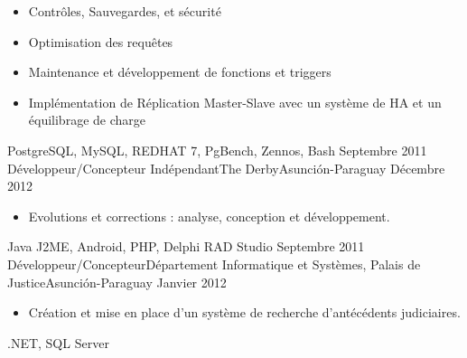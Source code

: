\begin{experiences}
{\begin{itemize}
                        \item Contrôles, Sauvegardes, et sécurité
                        \item Optimisation des requêtes
                        \item Maintenance et développement de fonctions et triggers
                        \item Implémentation de Réplication Master-Slave avec un système de HA et un équilibrage de charge
                      \end{itemize}
				}
                {PostgreSQL, MySQL, REDHAT 7, PgBench, Zennos, Bash}
  \emptySeparator
  \experience
    {Septembre 2011}   {Développeur/Concepteur Indépendant}{The Derby}{Asunción-Paraguay}
    {Décembre 2012} {
                      \begin{itemize}
                        \item Evolutions et corrections : analyse, conception et développement.
                      \end{itemize}
				}
                {Java J2ME, Android, PHP, Delphi RAD Studio}
  \emptySeparator
  \experience
    {Septembre 2011}   {Développeur/Concepteur}{Département Informatique et Systèmes, Palais de Justice}{Asunción-Paraguay}
    {Janvier 2012} {
                      \begin{itemize}
                        \item Création et mise en place d’un système de recherche d’antécédents judiciaires.
                      \end{itemize}
				}
                {.NET, SQL Server}
  \emptySeparator
\end{experiences}
